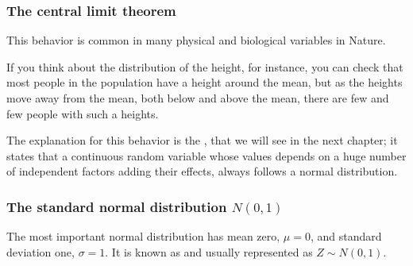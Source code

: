 \begin{frame}
\frametitle{The central limit theorem}
This behavior is common in many physical and biological variables in Nature.

If you think about the distribution of the height, for instance, you can check that most people in the population have a height around the mean, but as the heights move away from the mean, both below and above the mean, there are few and few people with such a heights.

The explanation for this behavior is the , that we will see in the next
chapter; it states that a continuous random variable whose values depends on a huge number of independent factors
adding their effects,  always follows a normal distribution.
\end{frame}


\begin{frame}
\frametitle{The standard normal distribution $N(0,1)$}
The most important normal distribution has mean zero, $\mu=0$, and standard deviation one, $\sigma=1$.
It is known as  and usually represented as $Z\sim N(0,1)$.
\begin{center}
\end{center}
\end{frame}


